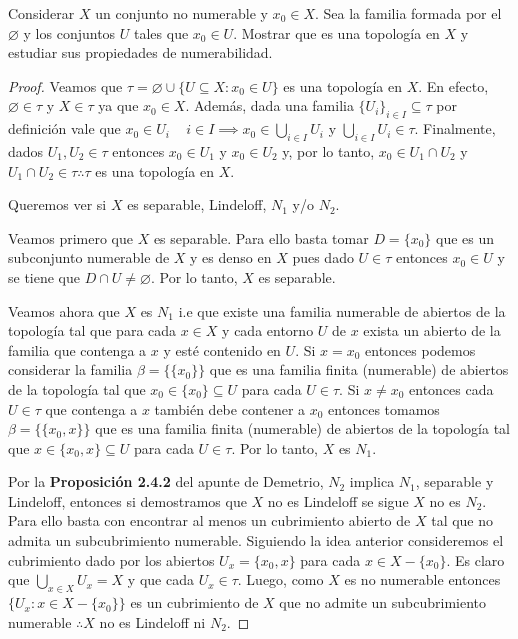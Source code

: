 \documentclass{article}
\theoremstyle{definition}
\newenvironment{ejercicio}[1]{\begin{trivlist}
\item[\hskip \labelsep {\bfseries Ejercicio}\hskip \labelsep {\bfseries #1.}]}{\end{trivlist}}
\begin{document}
\begin{ejercicio}{11}
    Considerar \(X\) un conjunto no numerable y \(x_{0}\in X\). Sea la familia formada por el \( \varnothing \) y los conjuntos \(U\) tales que \(x_{0}\in U\).
    Mostrar que es una topología en \(X\) y estudiar sus propiedades de numerabilidad.
\end{ejercicio}
\begin{proof}
    Veamos que \( \tau = \varnothing \cup \{ U \subseteq X : x_0 \in U \} \) es una topología en \( X \). En efecto, \( \varnothing \in \tau \) y \( X \in \tau \) ya que \( x_0 \in X \).
    Además, dada una familia \( {\{ U_i \}}_{i \in I} \subseteq \tau \) por definición vale que \( x_0 \in U_i \quad \, i \in I \implies x_0 \in \bigcup_{i \in I} U_i \) y \( \bigcup_{i \in I} U_i \in \tau \).
    Finalmente, dados \( U_1, U_2 \in \tau \) entonces \( x_0 \in U_1 \) y \( x_0 \in U_2 \) y, por lo tanto, \( x_0 \in U_1 \cap U_2 \) y \( U_1 \cap U_2 \in \tau \therefore \tau \) es una topología en \( X \).

    Queremos ver si \( X \) es separable, Lindeloff, \( N_1 \) y/o \( N_2 \).

    Veamos primero que \( X \) es separable. Para ello basta tomar \( D = \{ x_0 \} \) que es un subconjunto numerable de \( X \) y es
    denso en \( X \) pues dado \( U \in \tau \) entonces \( x_0 \in U \) y se tiene que \( D \cap U \neq \varnothing \). Por lo tanto, \( X \) es separable.

    Veamos ahora que \( X \) es \( N_1 \) i.e que existe una familia numerable de abiertos de la topología tal que para cada \( x \in X \) y cada entorno \( U \) de \( x \) exista un abierto de la familia que contenga a \( x \) y esté contenido en \( U \).
    Si \( x = x_0 \) entonces podemos considerar la familia \( \beta = \{ \{ x_0 \} \} \) que es una familia finita (numerable) de abiertos de la topología tal que \( x_0 \in \{ x_0 \} \subseteq U \) para cada \( U \in \tau \).
    Si \( x \neq x_0 \) entonces cada \( U \in \tau \) que contenga a \( x \) también debe contener a \( x_0 \) entonces tomamos \( \beta = \{ \{x_0, x \} \} \) que es una familia finita (numerable) de abiertos de la topología tal que
    \( x \in \{ x_0, x \} \subseteq U \) para cada \( U \in \tau \). Por lo tanto, \( X \) es \( N_1 \).

    Por la \textbf{Proposición 2.4.2} del apunte de Demetrio, \( N_2 \) implica \( N_1 \), separable y Lindeloff, entonces si demostramos que \( X \) no es Lindeloff se sigue \( X \) no es \( N_2 \).
    Para ello basta con encontrar al menos un cubrimiento abierto de \( X \) tal que no admita un subcubrimiento numerable. Siguiendo la idea anterior consideremos el cubrimiento dado por los abiertos
    \( U_x = \{ x_0, x \} \) para cada \( x \in X - \{ x_0 \} \). Es claro que \( \bigcup_{x \in X} U_x = X \) y que cada \( U_x \in \tau \). Luego, como \( X \) es no numerable entonces
    \( \{ U_x : x \in X - \{ x_0 \} \} \) es un cubrimiento de \( X \) que no admite un subcubrimiento numerable \( \therefore X \) no es Lindeloff ni \( N_2 \).
\end{proof}
\end{document}
